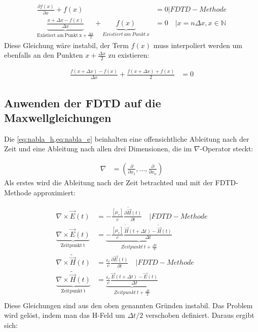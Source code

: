 \documentclass[11pt, ngerman]{article}
\begin{document}
\begin{align}
	\frac{\partial f(x)}{\partial x} + f(x) &= 0 \vert FDTD-Methode \\
	\underbrace{\frac{x + \Delta x - f(x)}{\Delta x}}_{\mathrm{Existiert\ am\ Punkt\ x + \frac{\Delta x}{2}}} + \underbrace{f(x)}_{Existiert\ am\ Punkt\ x} &= 0\quad\vert x = n\Delta x, x \in \mathbb{N}  
\end{align}
Diese Gleichung w\"are instabil, der Term \(f(x)\) muss interpoliert werden um ebenfalls
an den Punkten \(x + \frac{\Delta x}{2}\) zu existieren:

\begin{align}
	\frac{f(x + \Delta x) - f(x)}{\Delta x} + \frac{f(x + \Delta x) + f(x)}{2} &= 0
\end{align}

\subsection{Anwenden der FDTD auf die Maxwellgleichungen}
Die \cref{eq:nabla_h,eq:nabla_e} beinhalten eine offensichtliche Ableitung nach
der Zeit und eine Ableitung nach allen drei Dimensionen, die im \(\nabla\)-Operator
steckt:

\begin{align}
	\nabla &= (\frac{\partial}{\partial x_1}, \ldots, \frac{\partial}{\partial x_n})
\end{align}
Als erstes wird die Ableitung nach der Zeit betrachted und mit der FDTD-Methode approximiert:

\begin{align}
	\nabla\times\vec{E}(t) &= -\frac{[\mu_r]}{c}\frac{\partial\widetilde{\vec{H}}(t)}{\partial t}\quad\vert FDTD-Methode \\
	\underbrace{\nabla\times\vec{E}(t)}_{\mathrm{Zeitpunkt\ t}} &= \underbrace{-\frac{[\mu_r]}{c}\frac{\widetilde{\vec{H}}(t+\Delta t)-\widetilde{\vec{H}}(t)}{\Delta t}}_{Zeitpunkt\ t+\frac{\Delta t}{2}} \\
	\nabla\times\widetilde{\vec{H}}(t) &= \frac{\epsilon_r}{c}\frac{\partial\vec{E}(t)}{\partial t}\quad\vert FDTD-Methode \\
	\underbrace{\nabla\times\widetilde{\vec{H}}(t)}_{\mathrm{Zeitpunkt\ t}} &= \underbrace{\frac{\epsilon_r}{c}\frac{\vec{E}(t+\Delta t)-\vec{E}(t)}{\Delta t}}_{Zeitpunkt\ t+\frac{\Delta t}{2}}\\
\end{align}
Diese Gleichungen sind aus den oben genannten Gr\"unden instabil. Das Problem wird gel\"ost, indem man das 
H-Feld um \(\Delta t/2\) verschoben definiert.\cite{approximation_time}
Daraus ergibt sich:
\end{document}
